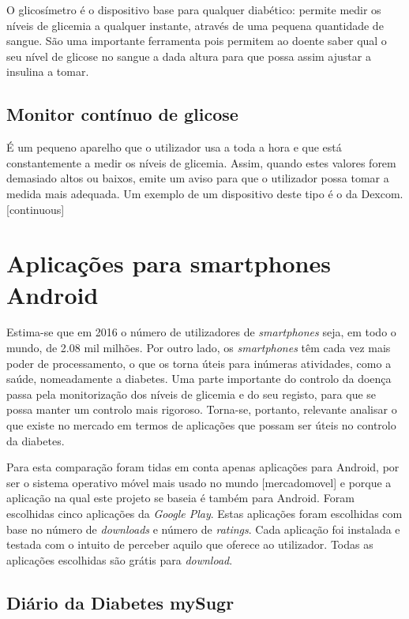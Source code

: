 O glicosímetro é o dispositivo base para qualquer diabético: permite medir os níveis de glicemia a qualquer instante, através de uma pequena quantidade de sangue. São uma importante ferramenta pois permitem ao doente saber qual o seu nível de glicose no sangue a dada altura para que possa assim ajustar a insulina a tomar.

\subsection{Monitor contínuo de glicose}

É um pequeno aparelho que o utilizador usa a toda a hora e que está constantemente a medir os níveis de glicemia. Assim, quando estes valores forem demasiado altos ou baixos, emite um aviso para que o utilizador possa tomar a medida mais adequada. Um exemplo de um dispositivo deste tipo é o da Dexcom. [continuous]

\section{Aplicações para smartphones Android}

Estima-se que em 2016 o número de utilizadores de \textit{smartphones} seja, em todo o mundo, de 2.08 mil milhões. Por outro lado, os \textit{smartphones} têm cada vez mais poder de processamento, o que os torna úteis para inúmeras atividades, como a saúde, nomeadamente a diabetes. Uma parte importante do controlo da doença passa pela monitorização dos níveis de glicemia e do seu registo, para que se possa manter um controlo mais rigoroso. Torna-se, portanto, relevante analisar o que existe no mercado em termos de aplicações que possam ser úteis no controlo da diabetes.

Para esta comparação foram tidas em conta apenas aplicações para Android, por ser o sistema operativo móvel mais usado no mundo [mercadomovel] e porque a aplicação na qual este projeto se baseia é também para Android. Foram escolhidas cinco aplicações da \textit{Google Play}. Estas aplicações foram escolhidas com base no número de \textit{downloads} e número de \textit{ratings}. Cada aplicação foi instalada e testada com o intuito de perceber aquilo que oferece ao utilizador. Todas as aplicações escolhidas são grátis para \textit{download}.


\subsection{Diário da Diabetes mySugr}

